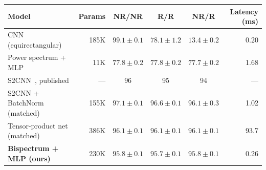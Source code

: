 \begin{tabular}{lrcccr}
\toprule
Model & Params & NR/NR & R/R & NR/R & Latency (ms) \\
\midrule
CNN (equirectangular) & 185K & $99.1 {\pm} 0.1$ & $78.1 {\pm} 1.2$ & $13.4 {\pm} 0.2$ & 0.20 \\
Power spectrum + MLP & 11K & $77.8 {\pm} 0.2$ & $77.8 {\pm} 0.2$ & $77.7 {\pm} 0.2$ & 1.68 \\
\midrule
S2CNN~\citep{cohen2018spherical}, published & --- & 96 & 95 & 94 & --- \\
S2CNN + BatchNorm (matched) & 155K & $97.1 {\pm} 0.1$ & $96.6 {\pm} 0.1$ & $96.1 {\pm} 0.3$ & 1.02 \\
Tensor-product net (matched) & 386K & $96.1 {\pm} 0.1$ & $96.1 {\pm} 0.1$ & $96.1 {\pm} 0.1$ & 93.7 \\
\midrule
\textbf{Bispectrum + MLP (ours)} & 230K & $95.8 {\pm} 0.1$ & $95.7 {\pm} 0.1$ & $95.8 {\pm} 0.1$ & 0.26 \\
\bottomrule
\end{tabular}
